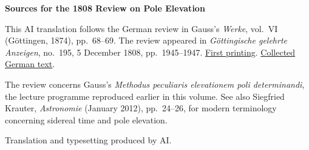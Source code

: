\clearpage\thispagestyle{empty}
\begin{center}\textbf{Sources for the 1808 Review on Pole Elevation}\end{center}
\noindent This AI translation follows the German review in Gauss’s \textit{Werke}, vol.~VI (Göttingen, 1874), pp.~68--69. The review appeared in \textit{Göttingische gelehrte Anzeigen}, no.~195, 5 December 1808, pp.~1945--1947. \href{https://manifests.sub.uni-goettingen.de/iiif/image/gdz:PPN319721507_1808:00001951/full/1200,/0/default.jpg}{First printing}. \href{https://gdz.sub.uni-goettingen.de/id/PPN236007467}{Collected German text}.
\par\smallskip\noindent The review concerns Gauss’s \textit{Methodus peculiaris elevationem poli determinandi}, the lecture programme reproduced earlier in this volume. See also Siegfried Krauter, \textit{Astronomie} (January 2012), pp.~24--26, for modern terminology concerning sidereal time and pole elevation.
\par\smallskip\noindent Translation and typesetting produced by AI.
\clearpage
